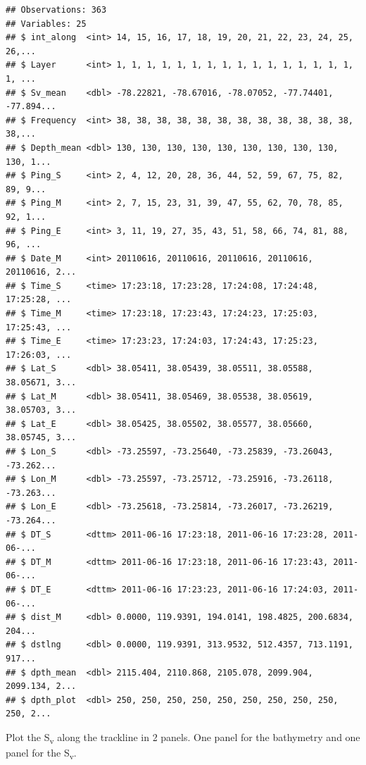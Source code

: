 \documentclass[]{article}
\begin{document}
\begin{verbatim}
## Observations: 363
## Variables: 25
## $ int_along  <int> 14, 15, 16, 17, 18, 19, 20, 21, 22, 23, 24, 25, 26,...
## $ Layer      <int> 1, 1, 1, 1, 1, 1, 1, 1, 1, 1, 1, 1, 1, 1, 1, 1, 1, ...
## $ Sv_mean    <dbl> -78.22821, -78.67016, -78.07052, -77.74401, -77.894...
## $ Frequency  <int> 38, 38, 38, 38, 38, 38, 38, 38, 38, 38, 38, 38, 38,...
## $ Depth_mean <dbl> 130, 130, 130, 130, 130, 130, 130, 130, 130, 130, 1...
## $ Ping_S     <int> 2, 4, 12, 20, 28, 36, 44, 52, 59, 67, 75, 82, 89, 9...
## $ Ping_M     <int> 2, 7, 15, 23, 31, 39, 47, 55, 62, 70, 78, 85, 92, 1...
## $ Ping_E     <int> 3, 11, 19, 27, 35, 43, 51, 58, 66, 74, 81, 88, 96, ...
## $ Date_M     <int> 20110616, 20110616, 20110616, 20110616, 20110616, 2...
## $ Time_S     <time> 17:23:18, 17:23:28, 17:24:08, 17:24:48, 17:25:28, ...
## $ Time_M     <time> 17:23:18, 17:23:43, 17:24:23, 17:25:03, 17:25:43, ...
## $ Time_E     <time> 17:23:23, 17:24:03, 17:24:43, 17:25:23, 17:26:03, ...
## $ Lat_S      <dbl> 38.05411, 38.05439, 38.05511, 38.05588, 38.05671, 3...
## $ Lat_M      <dbl> 38.05411, 38.05469, 38.05538, 38.05619, 38.05703, 3...
## $ Lat_E      <dbl> 38.05425, 38.05502, 38.05577, 38.05660, 38.05745, 3...
## $ Lon_S      <dbl> -73.25597, -73.25640, -73.25839, -73.26043, -73.262...
## $ Lon_M      <dbl> -73.25597, -73.25712, -73.25916, -73.26118, -73.263...
## $ Lon_E      <dbl> -73.25618, -73.25814, -73.26017, -73.26219, -73.264...
## $ DT_S       <dttm> 2011-06-16 17:23:18, 2011-06-16 17:23:28, 2011-06-...
## $ DT_M       <dttm> 2011-06-16 17:23:18, 2011-06-16 17:23:43, 2011-06-...
## $ DT_E       <dttm> 2011-06-16 17:23:23, 2011-06-16 17:24:03, 2011-06-...
## $ dist_M     <dbl> 0.0000, 119.9391, 194.0141, 198.4825, 200.6834, 204...
## $ dstlng     <dbl> 0.0000, 119.9391, 313.9532, 512.4357, 713.1191, 917...
## $ dpth_mean  <dbl> 2115.404, 2110.868, 2105.078, 2099.904, 2099.134, 2...
## $ dpth_plot  <dbl> 250, 250, 250, 250, 250, 250, 250, 250, 250, 250, 2...
\end{verbatim}

Plot the S\textsubscript{v} along the trackline in 2 panels. One panel
for the bathymetry and one panel for the S\textsubscript{v}.
\end{document}
